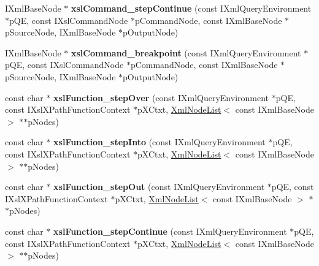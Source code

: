 \begin{DoxyCompactItemize}
\item 
\hypertarget{group__XSLModule-Commands_gace9c3d1665364d34292c051a083e79c9}{\-I\-Xml\-Base\-Node $\ast$ {\bfseries xsl\-Command\-\_\-step\-Continue} (const \-I\-Xml\-Query\-Environment $\ast$p\-Q\-E, const \-I\-Xsl\-Command\-Node $\ast$p\-Command\-Node, const \-I\-Xml\-Base\-Node $\ast$p\-Source\-Node, \-I\-Xml\-Base\-Node $\ast$p\-Output\-Node)}\label{group__XSLModule-Commands_gace9c3d1665364d34292c051a083e79c9}

\item 
\hypertarget{group__XSLModule-Commands_ga9b487cde62c4395e1fc1646ad053627c}{\-I\-Xml\-Base\-Node $\ast$ {\bfseries xsl\-Command\-\_\-breakpoint} (const \-I\-Xml\-Query\-Environment $\ast$p\-Q\-E, const \-I\-Xsl\-Command\-Node $\ast$p\-Command\-Node, const \-I\-Xml\-Base\-Node $\ast$p\-Source\-Node, \-I\-Xml\-Base\-Node $\ast$p\-Output\-Node)}\label{group__XSLModule-Commands_ga9b487cde62c4395e1fc1646ad053627c}

\item 
\hypertarget{group__XSLModule-Functions_ga3b43b34cb221eb0c191fc3bb3982150f}{const char $\ast$ {\bfseries xsl\-Function\-\_\-step\-Over} (const \-I\-Xml\-Query\-Environment $\ast$p\-Q\-E, const \-I\-Xsl\-X\-Path\-Function\-Context $\ast$p\-X\-Ctxt, \hyperlink{classgeneral__server_1_1XmlNodeList}{\-Xml\-Node\-List}$<$ const \-I\-Xml\-Base\-Node $>$ $\ast$$\ast$p\-Nodes)}\label{group__XSLModule-Functions_ga3b43b34cb221eb0c191fc3bb3982150f}

\item 
\hypertarget{group__XSLModule-Functions_gaa6c4cac1c9a46d26d9ca491f587c8293}{const char $\ast$ {\bfseries xsl\-Function\-\_\-step\-Into} (const \-I\-Xml\-Query\-Environment $\ast$p\-Q\-E, const \-I\-Xsl\-X\-Path\-Function\-Context $\ast$p\-X\-Ctxt, \hyperlink{classgeneral__server_1_1XmlNodeList}{\-Xml\-Node\-List}$<$ const \-I\-Xml\-Base\-Node $>$ $\ast$$\ast$p\-Nodes)}\label{group__XSLModule-Functions_gaa6c4cac1c9a46d26d9ca491f587c8293}

\item 
\hypertarget{group__XSLModule-Functions_gad0d4159e7674578b99aebc918c9ab025}{const char $\ast$ {\bfseries xsl\-Function\-\_\-step\-Out} (const \-I\-Xml\-Query\-Environment $\ast$p\-Q\-E, const \-I\-Xsl\-X\-Path\-Function\-Context $\ast$p\-X\-Ctxt, \hyperlink{classgeneral__server_1_1XmlNodeList}{\-Xml\-Node\-List}$<$ const \-I\-Xml\-Base\-Node $>$ $\ast$$\ast$p\-Nodes)}\label{group__XSLModule-Functions_gad0d4159e7674578b99aebc918c9ab025}

\item 
\hypertarget{group__XSLModule-Functions_ga35751a440d6ac4a700264a035b5509db}{const char $\ast$ {\bfseries xsl\-Function\-\_\-step\-Continue} (const \-I\-Xml\-Query\-Environment $\ast$p\-Q\-E, const \-I\-Xsl\-X\-Path\-Function\-Context $\ast$p\-X\-Ctxt, \hyperlink{classgeneral__server_1_1XmlNodeList}{\-Xml\-Node\-List}$<$ const \-I\-Xml\-Base\-Node $>$ $\ast$$\ast$p\-Nodes)}\label{group__XSLModule-Functions_ga35751a440d6ac4a700264a035b5509db}


\end{DoxyCompactItemize}
